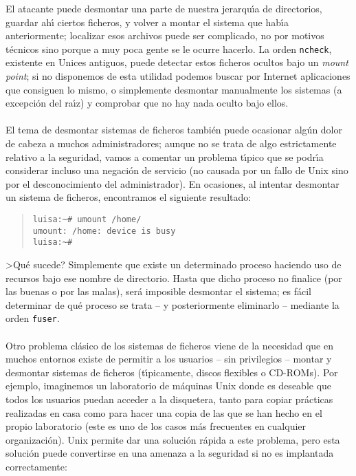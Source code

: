 El atacante puede desmontar una parte de nuestra jerarqu\'{\i}a de directorios,
guardar ah\'{\i} ciertos ficheros, y volver a montar el sistema que hab\'{\i}a
anteriormente; localizar esos archivos puede ser complicado, no por motivos 
t\'ecnicos sino porque a muy poca gente se le ocurre hacerlo. La orden 
{\tt ncheck}, existente en Unices antiguos, puede detectar estos ficheros
ocultos bajo un {\it mount point}; si no disponemos de esta utilidad podemos
buscar por Internet aplicaciones que consiguen lo mismo, o simplemente desmontar
manualmente los sistemas (a excepci\'on del ra\'{\i}z) y comprobar que no hay 
nada oculto bajo ellos.\\
\\El tema de desmontar sistemas de ficheros tambi\'en puede ocasionar alg\'un
dolor de cabeza a muchos administradores; aunque no se trata de algo 
estrictamente relativo a la seguridad, vamos a comentar un problema t\'{\i}pico
que se podr\'{\i}a considerar incluso una negaci\'on de servicio (no causada
por un fallo de Unix sino por el desconocimiento del administrador). En 
ocasiones, al intentar desmontar un sistema de ficheros, encontramos el
siguiente resultado:
\begin{quote}
\begin{verbatim}
luisa:~# umount /home/
umount: /home: device is busy
luisa:~#
\end{verbatim}
\end{quote}
>Qu\'e sucede? Simplemente que existe un determinado proceso haciendo uso de 
recursos bajo ese nombre de directorio. Hasta que dicho proceso no finalice
(por las buenas o por las malas), ser\'a imposible desmontar el sistema; es
f\'acil determinar de qu\'e proceso se trata -- y posteriormente eliminarlo --
mediante la orden {\tt fuser}.\\
\\Otro problema cl\'asico de los sistemas de ficheros viene de la necesidad que
en muchos entornos existe de permitir a los usuarios -- sin privilegios -- 
montar y desmontar sistemas de ficheros (t\'{\i}picamente, discos flexibles o
CD-ROMs). Por ejemplo, imaginemos un laboratorio de m\'aquinas Unix donde es
deseable que todos los usuarios puedan acceder a la disquetera, tanto para
copiar pr\'acticas realizadas en casa como para hacer una copia de las que se
han hecho en el propio laboratorio (este es uno de los casos m\'as frecuentes en
cualquier organizaci\'on). Unix permite dar una soluci\'on 
r\'apida a este problema, pero esta soluci\'on puede convertirse en una amenaza
a la seguridad si no es implantada correctamente:\\
